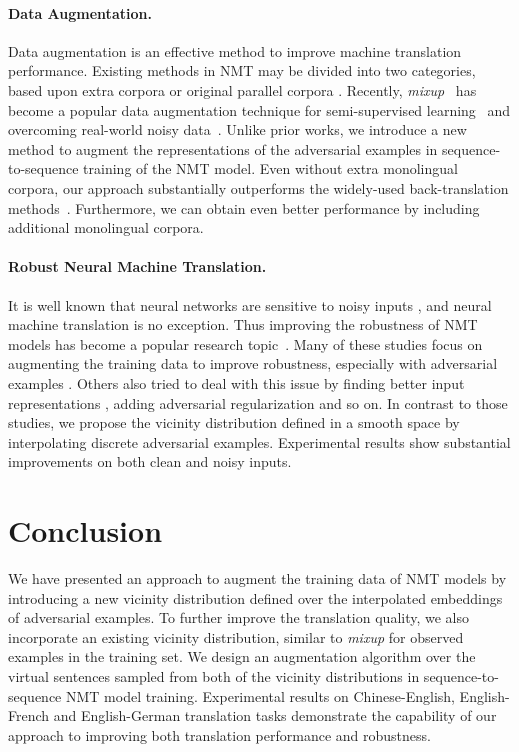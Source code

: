 \documentclass[11pt,a4paper]{article}
\newcommand{\mixup}{\textit{mixup}\xspace}
\begin{document}
\paragraph{Data Augmentation.}
Data augmentation is an effective method to improve machine translation performance.
Existing methods in NMT may be divided into two categories, based upon extra corpora \cite{Sennrich:16b,Cheng:16,Zhang:16,Edunov:18} or original parallel corpora \cite{Fadaee:17,Wang:18,Cheng:19}. Recently, \mixup~\cite{Zhang:18} has become a popular data augmentation technique for semi-supervised learning~\cite{Berthelot:19} and overcoming real-world noisy data~\cite{Jiang:19}. Unlike prior works, we introduce a new method to augment the representations of the adversarial examples in sequence-to-sequence training of the NMT model.
Even without extra monolingual corpora, our approach substantially outperforms the widely-used back-translation methods~\cite{Sennrich:16b, Edunov:18}. Furthermore, we can obtain even better performance by including additional monolingual corpora.


\paragraph{Robust Neural Machine Translation.}
It is well known that neural networks are sensitive to noisy inputs \cite{Szegedy:14, Goodfellow:14}, and neural machine translation is no exception.
Thus improving the robustness of NMT models has become a popular research topic~\cite[e.g.,][]{Belinkov:17,Sperber:17, Ebrahimi:18b, Cheng:18, Cheng:19, Karpukhin:19, Li:19}. 
Many of these studies focus on augmenting the training data to improve robustness, especially with adversarial examples \cite{Ebrahimi:18b, Cheng:19, Karpukhin:19, Michel:19}. Others also tried to deal with this issue by finding better input representations \cite{Durrani:19}, adding adversarial regularization \cite{Sano:19} and so on. In contrast to those studies, we propose the vicinity distribution defined in a smooth space by interpolating discrete adversarial examples.
Experimental results show substantial improvements on both clean and noisy inputs.


\section{Conclusion}
We have presented an approach to augment the training data of NMT models by introducing a new vicinity distribution defined over the interpolated embeddings of adversarial examples. To further improve the translation quality, we also incorporate an existing vicinity distribution, similar to \mixup for observed examples in the training set. We design an augmentation algorithm over the virtual sentences sampled from both of the vicinity distributions in sequence-to-sequence NMT model training. Experimental results on Chinese-English, English-French and English-German translation tasks demonstrate the capability of our approach to improving both translation performance and robustness.


\balance

\end{document}
